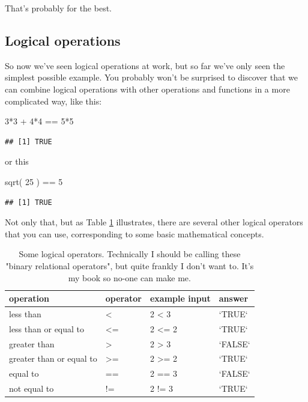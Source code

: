 \documentclass[
]{book}
\newenvironment{Shaded}{\begin{snugshade}}{\end{snugshade}}
\newcommand{\DecValTok}[1]{\textcolor[rgb]{0.00,0.00,0.81}{#1}}
\newcommand{\FunctionTok}[1]{\textcolor[rgb]{0.00,0.00,0.00}{#1}}
\newcommand{\NormalTok}[1]{#1}
\newcommand{\SpecialCharTok}[1]{\textcolor[rgb]{0.00,0.00,0.00}{#1}}
\begin{document}
That's probably for the best.

\hypertarget{logical-operations}{%
\subsection{Logical operations}\label{logical-operations}}

So now we've seen logical operations at work, but so far we've only seen the simplest possible example. You probably won't be surprised to discover that we can combine logical operations with other operations and functions in a more complicated way, like this:

\begin{Shaded}
\begin{Highlighting}[]
\DecValTok{3}\SpecialCharTok{*}\DecValTok{3} \SpecialCharTok{+} \DecValTok{4}\SpecialCharTok{*}\DecValTok{4} \SpecialCharTok{==} \DecValTok{5}\SpecialCharTok{*}\DecValTok{5}
\end{Highlighting}
\end{Shaded}

\begin{verbatim}
## [1] TRUE
\end{verbatim}

or this

\begin{Shaded}
\begin{Highlighting}[]
\FunctionTok{sqrt}\NormalTok{( }\DecValTok{25}\NormalTok{ ) }\SpecialCharTok{==} \DecValTok{5}
\end{Highlighting}
\end{Shaded}

\begin{verbatim}
## [1] TRUE
\end{verbatim}

Not only that, but as Table \ref{tab:logicals} illustrates, there are several other logical operators that you can use, corresponding to some basic mathematical concepts.

\begin{table}

\caption{\label{tab:logicals}Some logical operators. Technically I should be calling these "binary relational operators", but quite frankly I don't want to. It's my book so no-one can make me.}
\centering
\begin{tabular}[t]{llll}
\toprule
operation & operator & example input & answer\\
\midrule
less than & < & 2 < 3 & `TRUE`\\
less than or equal to & <= & 2 <= 2 & `TRUE`\\
greater than & > & 2 > 3 & `FALSE`\\
greater than or equal to & >= & 2 >= 2 & `TRUE`\\
equal to & == & 2 == 3 & `FALSE`\\
\addlinespace
not equal to & != & 2 != 3 & `TRUE`\\
\bottomrule
\end{tabular}
\end{table}
\end{document}
